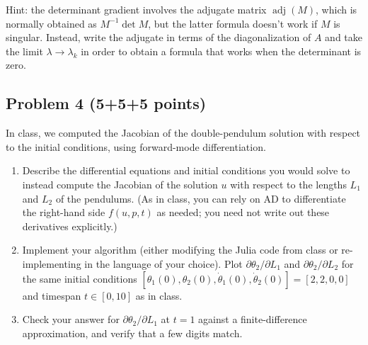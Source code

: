 \documentclass[10pt,oneside]{article}
\begin{document}

Hint: the determinant gradient involves the adjugate matrix $\operatorname{adj}(M)$, which is normally obtained as $M^{-1} \det M$, but the latter formula doesn't work if $M$ is singular.  Instead, write the adjugate in terms of the diagonalization of $A$ and take the limit $\lambda \to \lambda_k$ in order to obtain a formula that works when the determinant is zero.
\newpage
\subsection*{Problem 4 (5+5+5 points)}

In class, we computed the Jacobian of the double-pendulum solution with respect to the initial conditions, using forward-mode differentiation.   

\begin{enumerate}
    \item Describe the differential equations and initial conditions you would solve to instead compute the Jacobian of the solution $u$ with respect to the lengths $L_1$ and $L_2$ of the pendulums.  (As in class, you can rely on AD to differentiate the right-hand side $f(u,p,t)$ as needed; you need not write out these derivatives explicitly.)
    
    \item Implement your algorithm (either modifying the Julia code from class or re-implementing in the language of your choice).  Plot $\partial \theta_2 /\partial L_1$ and $\partial \theta_2 /\partial L_2$ for the same initial conditions $[\theta_1(0), \theta_2(0), \dot{\theta}_1(0), \dot{\theta}_2(0)] = [2,2,0,0]$ and timespan $t \in [0,10]$ as in class.

    \item Check your answer for $\partial \theta_2 /\partial L_1$ at $t = 1$ against a finite-difference approximation, and verify that a few digits match.
    
\end{enumerate}
\end{document}
